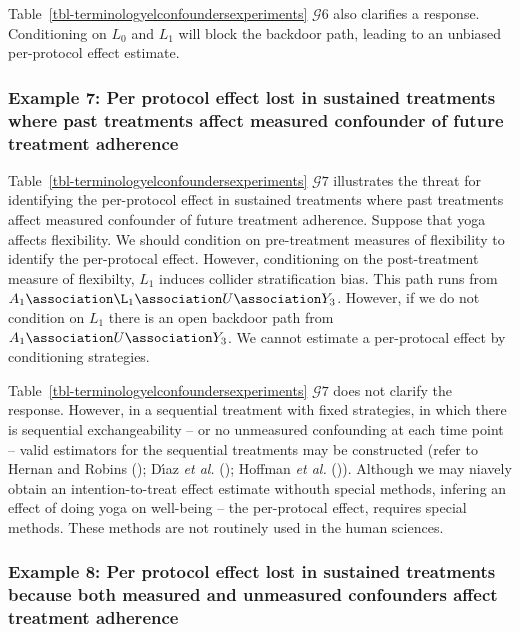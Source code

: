 \documentclass[
  single column]{article}
\begin{document}
Table~\ref{tbl-terminologyelconfoundersexperiments} \(\mathcal{G} 6\)
also clarifies a response. Conditioning on \(L_0\) and \(L_1\) will
block the backdoor path, leading to an unbiased per-protocol effect
estimate.

\subsubsection{Example 7: Per protocol effect lost in sustained
treatments where past treatments affect measured confounder of future
treatment
adherence}\label{example-7-per-protocol-effect-lost-in-sustained-treatments-where-past-treatments-affect-measured-confounder-of-future-treatment-adherence}

Table~\ref{tbl-terminologyelconfoundersexperiments} \(\mathcal{G} 7\)
illustrates the threat for identifying the per-protocol effect in
sustained treatments where past treatments affect measured confounder of
future treatment adherence. Suppose that yoga affects flexibility. We
should condition on pre-treatment measures of flexibility to identify
the per-protocal effect. However, conditioning on the post-treatment
measure of flexibilty, \(\boxed{L_1}\) induces collider stratification
bias. This path runs from
\(A_1 \association \L_1 \association U \association Y_3\). However, if
we do not condition on \(L_1\) there is an open backdoor path from
\(A_1 \association U \association Y_3\). We cannot estimate a
per-protocal effect by conditioning strategies.

Table~\ref{tbl-terminologyelconfoundersexperiments} \(\mathcal{G} 7\)
does not clarify the response. However, in a sequential treatment with
fixed strategies, in which there is sequential exchangeability -- or no
unmeasured confounding at each time point -- valid estimators for the
sequential treatments may be constructed (refer to Hernan and Robins
(); Dı́az \emph{et al.}
(); Hoffman \emph{et al.}
()). Although we may niavely obtain an
intention-to-treat effect estimate withouth special methods, infering an
effect of doing yoga on well-being -- the per-protocal effect, requires
special methods. These methods are not routinely used in the human
sciences.

\subsubsection{Example 8: Per protocol effect lost in sustained
treatments because both measured and unmeasured confounders affect
treatment
adherence}\label{example-8-per-protocol-effect-lost-in-sustained-treatments-because-both-measured-and-unmeasured-confounders-affect-treatment-adherence}
\end{document}
